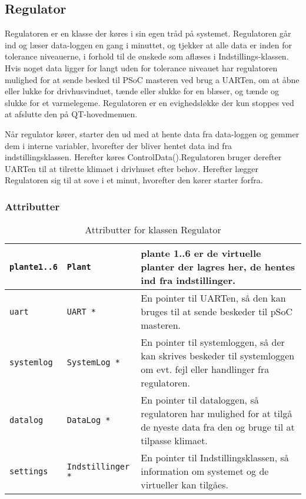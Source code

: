 \subsection{Regulator}

Regulatoren er en klasse der køres i sin egen tråd på systemet. Regulatoren går ind og læser data-loggen en gang i minuttet, og tjekker at alle data er inden for tolerance niveauerne, i forhold til de ønskede som aflæses i Indstillings-klassen. Hvis noget data ligger for langt uden for tolerance niveauet har regulatoren mulighed for at sende besked til PSoC masteren ved brug a UARTen, om at åbne eller lukke for drivhusvinduet, tænde eller slukke for en blæser, og tænde og slukke for et varmelegeme. Regulatoren er en evighedsløkke der kun stoppes ved at afslutte den på QT-hovedmenuen.

\mbox{}

Når regulator kører, starter den ud med at hente data fra data-loggen og gemmer dem i interne variabler, hvorefter der bliver hentet data ind fra indstillingsklassen. Herefter køres ControlData().Regulatoren bruger derefter UARTen til at tilrette klimaet i drivhuset efter behov. Herefter lægger Regulatoren sig til at sove i et minut, hvorefter den kører starter forfra.


\subsubsection{Attributter}

\begin{table}[h]
\begin{tabularx}{\textwidth}{| L{2.5cm} | l | Z |} \hline
\texttt{plante1..6} & \texttt{Plant} & plante 1..6 er de virtuelle planter der lagres her, de hentes ind fra indstillinger.\\\hline
\texttt{uart} & \texttt{UART *} & En pointer til UARTen, så den kan bruges til at sende beskeder til pSoC masteren.\\\hline
\texttt{systemlog} & \texttt{SystemLog *} & En pointer til systemloggen, så der kan skrives beskeder til systemloggen om evt. fejl eller handlinger fra regulatoren.\\\hline
\texttt{datalog} & \texttt{DataLog *} & En pointer til dataloggen, så regulatoren har mulighed for at tilgå de nyeste data fra den og bruge til at tilpasse klimaet.\\\hline
\texttt{settings} & \texttt{Indstillinger *} & En pointer til Indstillingsklassen, så information om systemet og de virtueller kan tilgåes.\\\hline
\end{tabularx}
\caption{Attributter for klassen Regulator}
\label{table:Regulator_attributter}
\end{table}

